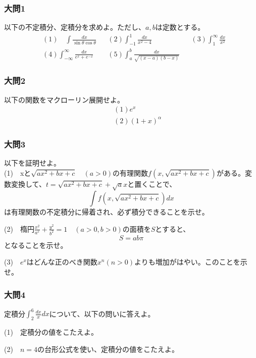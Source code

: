 \documentclass[a4j,dvipdfmx]{jsarticle}
\begin{document}
    \subsubsection*{大問1}
    以下の不定積分、定積分を求めよ。ただし、$a,b$は定数とする。
    \begin{align*}
        &(1)\quad\int \frac{dx}{\sin\theta\cos\theta}&&(2) \int_{-1}^{1}\frac{dx}{x^2-4}&&(3) \int_1^{\infty}\frac{dx}{x^2}\\
        &(4)\int_{-\infty}^{\infty}\frac{dx}{e^x+e^{-x}}&&(5) \int_a^b \frac{dx}{\sqrt{(x-a)(b-x)}}
    \end{align*}
    \subsubsection*{大問2}
    以下の関数をマクローリン展開せよ。
    \begin{align*}
        &\quad (1)e^x\\
        &\quad (2)(1+x)^{\alpha}
    \end{align*}
    \subsubsection*{大問3}
    以下を証明せよ。\\
    
    (1)　xと$\sqrt{ax^2+bx+c}\quad(a>0)$の有理関数$f(x,\sqrt{ax^2+bx+c})$がある。変数変換して、$t=\sqrt{ax^2+bx+c}+\sqrt{a}x$と置くことで、
    \begin{equation*}
        \int f(x,\sqrt{ax^2+bx+c})dx
    \end{equation*}
    は有理関数の不定積分に帰着され、必ず積分できることを示せ。

    (2)　楕円$\displaystyle \frac{x^2}{a^x}+\frac{y^2}{b^2}=1\quad(a>0,b>0)$の面積を$S$とすると、
    \begin{equation*}
        S=ab\pi
    \end{equation*}
    となることを示せ。

    (3)　$e^x$はどんな正のべき関数$x^n(n>0)$よりも増加がはやい。このことを示せ。
    \subsubsection*{大問4}
    定積分$\displaystyle \int_2^6\frac{dx}{x}dx$について、以下の問いに答えよ。

    (1)　定積分の値をこたえよ。

    (2)　$n=4$の台形公式を使い、定積分の値をこたえよ。
\end{document}
